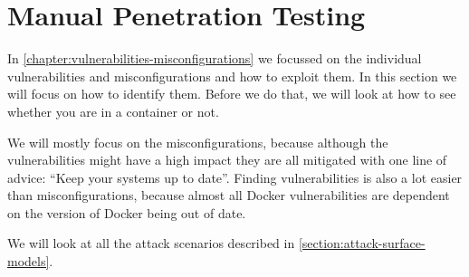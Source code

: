 \section{Manual Penetration Testing}
In \autoref{chapter:vulnerabilities-misconfigurations} we focussed on the individual vulnerabilities and misconfigurations and how to exploit them. In this section we will focus on how to identify them. Before we do that, we will look at how to see whether you are in a container or not.

We will mostly focus on the misconfigurations, because although the vulnerabilities might have a high impact they are all mitigated with one line of advice: ``Keep your systems up to date''. Finding vulnerabilities is also a lot easier than misconfigurations, because almost all Docker vulnerabilities are dependent on the version of Docker being out of date.

We will look at all the attack scenarios described in \autoref{section:attack-surface-models}.





